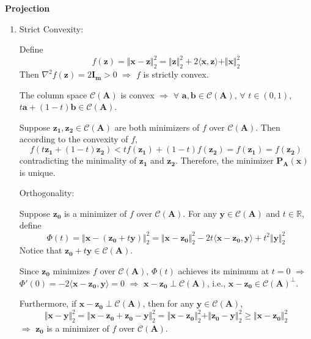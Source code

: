 \documentclass[11pt,letter,notitlepage]{article}
\newcommand{\proj}[2]{\textbf{P}_{#2} (#1)}
\theoremstyle{definition}
\begin{document}
\newpage

\begin{solution}\textbf{Projection}
\begin{enumerate}
	\item
	 Strict Convexity:

	Define
	$$f(\mathbf{z}) = \Vert \mathbf{x} - \mathbf{z} \Vert_2^2 = \Vert \mathbf{z} \Vert_2^2 + 2\langle \mathbf{x}, \mathbf{z} \rangle + \Vert \mathbf{x} \Vert_2^2$$
	Then $\nabla^2 f(\mathbf{z}) = 2 \mathbf{I_m} > 0$ $\Longrightarrow$ $f$ is strictly convex. 
	
	The column space $\mathcal{C}(\mathbf{A})$ is convex $\Longrightarrow$ $\forall$ $\mathbf{a}, \mathbf{b} \in \mathcal{C}(\mathbf{A})$, $\forall$ $t \in (0,1)$, $t\mathbf{a} + (1-t)\mathbf{b} \in \mathcal{C}(\mathbf{A})$. 
	
	Suppose $\mathbf{z_1}, \mathbf{z_2} \in \mathcal{C}(\mathbf{A})$ are both minimizers of $f$ over $\mathcal{C}(\mathbf{A})$. Then according to the convexity of $f$,
	\[
	f(t\mathbf{z_1} + (1-t)\mathbf{z_2}) < tf(\mathbf{z_1}) + (1-t)f(\mathbf{z_2}) = f(\mathbf{z_1}) = f(\mathbf{z_2})
	\]
	contradicting the minimality of $\mathbf{z_1}$ and $\mathbf{z_2}$. Therefore, the minimizer $\proj{\mathbf{x}}{\mathbf{A}}$ is unique.

	 Orthogonality:
	
	Suppose $\mathbf{z_0}$ is a minimizer of $f$ over $\mathcal{C}(\mathbf{A})$. For any $\mathbf{y} \in \mathcal{C}(\mathbf{A})$ and $t \in \mathbb{R}$, define
	$$\Phi(t) = \Vert \mathbf{x}-(\mathbf{z_0} + t\mathbf{y}) \Vert_2^2 = \Vert \mathbf{x} - \mathbf{z_0} \Vert_2^2 - 2t\langle\mathbf{x}-\mathbf{z_0}, \mathbf{y}\rangle + t^2 \Vert \mathbf{y} \Vert_2^2$$
	Notice that $\mathbf{z_0} + t\mathbf{y} \in \mathcal{C}(\mathbf{A})$.

	Since $\mathbf{z_0}$ minimizes $f$ over $\mathcal{C}(\mathbf{A})$, $\Phi(t)$ achieves its minimum at $t = 0$ $\Longrightarrow$ $\Phi'(0) = -2 \langle \mathbf{x} - \mathbf{z_0}, \mathbf{y} \rangle = 0$ $\Longrightarrow$ $\mathbf{x} - \mathbf{z_0} \perp \mathcal{C}(\mathbf{A})$, i.e., $\mathbf{x} - \mathbf{z_0} \in \mathcal{C}(\mathbf{A})^{\perp}$.

	Furthermore, if $\mathbf{x} - \mathbf{z_0} \perp \mathcal{C}(\mathbf{A})$, then for any $\mathbf{y} \in \mathcal{C}(\mathbf{A})$,
	\[
	\Vert \mathbf{x} - \mathbf{y} \Vert_2^2 = \Vert \mathbf{x} - \mathbf{z_0} + \mathbf{z_0} - \mathbf{y} \Vert_2^2 = \Vert \mathbf{x} - \mathbf{z_0} \Vert_2^2 + \Vert \mathbf{z_0} - \mathbf{y} \Vert_2^2 \geq \Vert \mathbf{x} - \mathbf{z_0} \Vert_2^2
	\]
	$\Longrightarrow$ $\mathbf{z_0}$ is a minimizer of $f$ over $\mathcal{C}(\mathbf{A})$.


\end{enumerate}
\end{solution}
\end{document}
